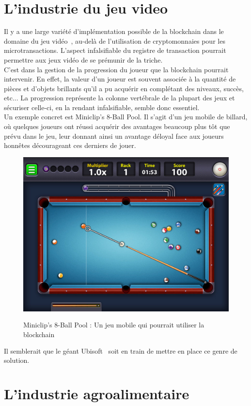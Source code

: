 \documentclass[12pt, a4paper, oneside]{book}
\begin{document}
    \section{L'industrie du jeu video}

    Il y a une large variété d’implémentation possible de la blockchain dans le domaine du jeu vidéo~\cite{JV}, au-delà de l’utilisation de cryptomonnaies pour les microtransactions.  L’aspect infalsifiable du registre de transaction pourrait permettre aux jeux vidéo de se prémunir de la triche.
    \\
    C’est dans la gestion de la progression du joueur que la blockchain pourrait intervenir. En effet, la valeur d’un joueur est souvent associée à la quantité de pièces et d’objets brillants qu’il a pu acquérir en complétant des niveaux, succès, etc... La progression représente la colonne vertébrale de la plupart des jeux et sécuriser celle-ci, en la rendant infalsifiable, semble donc essentiel.
    \\
    Un exemple concret est Miniclip’s 8-Ball Pool. Il s’agit d’un jeu mobile de billard, où quelques joueurs ont réussi acquérir des avantages beaucoup plus tôt que prévu dans le jeu, leur donnant ainsi un avantage déloyal face aux joueurs honnêtes décourageant ces derniers de jouer.
    
    \begin{figure}[H]
        \begin{center}
          \includegraphics[width=.43\textwidth]{images/billard.jpg}
          \label{fig:chaine}
          \caption{Miniclip’s 8-Ball Pool : Un jeu mobile qui pourrait utiliser la blockchain}
        \end{center}
    \end{figure}

    Il semblerait que le géant Ubisoft~\cite{ubi} soit en train de mettre en place ce genre de solution.

    \section{L'industrie agroalimentaire}
\end{document}
